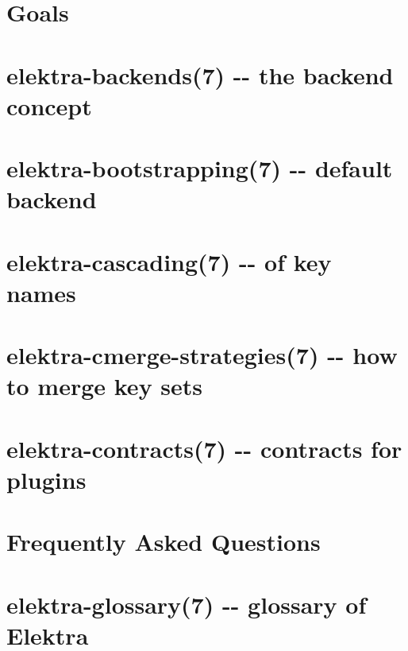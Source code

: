 \documentclass[twoside]{book}
\newcommand{\+}{\discretionary{\mbox{\scriptsize$\hookleftarrow$}}{}{}}
\begin{document}
\chapter{Goals}
\label{doc_GOALS_md}

\chapter{elektra-\/backends(7) -\/-\/ the backend concept}
\label{doc_help_elektra-backends_md}

\chapter{elektra-\/bootstrapping(7) -\/-\/ default backend}
\label{doc_help_elektra-bootstrapping_md}

\chapter{elektra-\/cascading(7) -\/-\/ of key names}
\label{doc_help_elektra-cascading_md}

\chapter{elektra-\/cmerge-\/strategies(7) -\/-\/ how to merge key sets}
\label{doc_help_elektra-cmerge-strategy_md}

\chapter{elektra-\/contracts(7) -\/-\/ contracts for plugins}
\label{doc_help_elektra-contracts_md}

\chapter{Frequently Asked Questions}
\label{doc_help_elektra-faq_md}

\chapter{elektra-\/glossary(7) -\/-\/ glossary of Elektra}
\label{doc_help_elektra-glossary_md}

\end{document}
